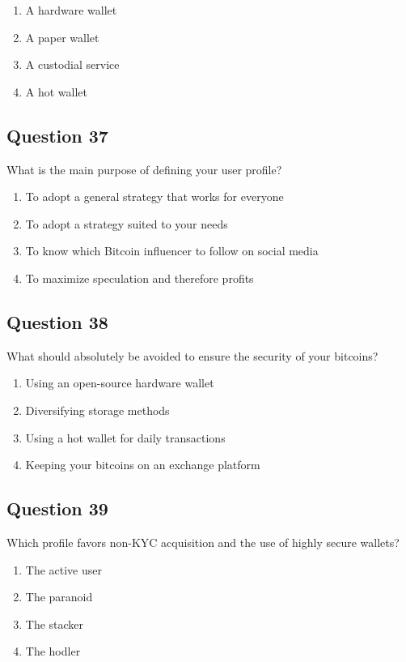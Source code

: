 \documentclass[12pt,a4paper]{article}
\begin{document}
\begin{enumerate}[label=\Alph*., leftmargin=*]
\item A hardware wallet
\item A paper wallet
\item A custodial service
\item A hot wallet
\end{enumerate}

\bigskip


\subsection*{Question 37}
What is the main purpose of defining your user profile?

\begin{enumerate}[label=\Alph*., leftmargin=*]
\item To adopt a general strategy that works for everyone
\item To adopt a strategy suited to your needs
\item To know which Bitcoin influencer to follow on social media
\item To maximize speculation and therefore profits
\end{enumerate}

\bigskip


\subsection*{Question 38}
What should absolutely be avoided to ensure the security of your bitcoins?

\begin{enumerate}[label=\Alph*., leftmargin=*]
\item Using an open-source hardware wallet
\item Diversifying storage methods
\item Using a hot wallet for daily transactions
\item Keeping your bitcoins on an exchange platform
\end{enumerate}

\bigskip


\subsection*{Question 39}
Which profile favors non-KYC acquisition and the use of highly secure wallets?

\begin{enumerate}[label=\Alph*., leftmargin=*]
\item The active user
\item The paranoid
\item The stacker
\item The hodler
\end{enumerate}
\end{document}
